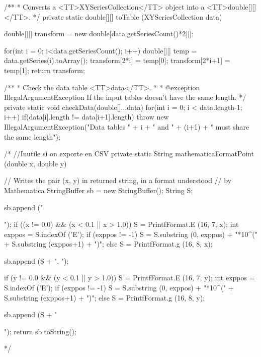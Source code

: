 \begin{code}
\begin{hide}
   /**
    * Converts a <TT>XYSeriesCollection</TT> object into a <TT>double[][]</TT>.
    */
   private static double[][] toTable (XYSeriesCollection data) {
      double[][] transform = new double[data.getSeriesCount()*2][];

      for(int i = 0; i<data.getSeriesCount(); i++) {
         double[][] temp = data.getSeries(i).toArray();
         transform[2*i] = temp[0];
         transform[2*i+1] = temp[1];
      }
      return transform;
   }


   /**
    * Check the data table <TT>data</TT>.
    *
    * @exception  IllegalArgumentException   If the input tables doesn't have the same length.
    */
   private static void checkData(double[]...data) {
      for(int i = 0; i < data.length-1; i++) {
         if(data[i].length != data[i+1].length)
            throw new IllegalArgumentException("Data tables " + i + " and " + (i+1) + " must share the same length");
      }
   }

/* //Inutile si on exporte en CSV
   private static String mathematicaFormatPoint (double x, double y) {
      // Writes the pair (x, y) in returned string, in a format understood
      // by Mathematica
      StringBuffer sb = new StringBuffer();
      String S;

      sb.append ("   { ");
      if ((x != 0.0) && (x < 0.1 || x > 1.0)) {
         S = PrintfFormat.E (16, 7, x);
         int exppos = S.indexOf ('E');
         if (exppos != -1)
            S = S.substring (0, exppos) + "*10^(" +
                             S.substring (exppos+1) + ")";
      }
      else
         S = PrintfFormat.g (16, 8, x);

      sb.append (S + ",     ");

      if (y != 0.0 && (y < 0.1 || y > 1.0)) {
         S = PrintfFormat.E (16, 7, y);
         int exppos = S.indexOf ('E');
         if (exppos != -1)
            S = S.substring (0, exppos) + "*10^(" +
                             S.substring (exppos+1) + ")";
      }
      else
        S = PrintfFormat.g (16, 8, y);

      sb.append (S + " }");
      return sb.toString();
   }*/\end{hide}
\end{code}
\begin{code}
\begin{hide}
}\end{hide}
\end{code}
